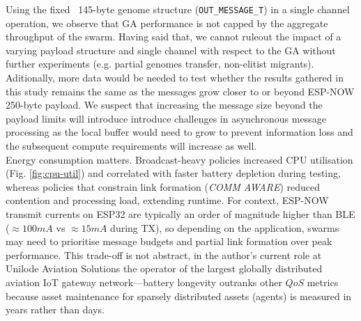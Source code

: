 \documentclass[conference]{IEEEtran}
\begin{document}

Using the fixed ~145-byte genome structure (\texttt{OUT\_MESSAGE\_T}) in a single channel operation, we observe that GA performance is not capped by the aggregate throughput of the swarm. Having said that, we cannot ruleout the impact of a varying payload structure and single channel with respect to the GA without further experiments (e.g. partial genomes transfer, non-elitist migrants). Aditionally, more data would be needed to test whether the results gathered in this study remains the same as the messages grow closer to or beyond ESP-NOW 250-byte payload. We suspect that increasing the message size beyond the payload limits will introduce introduce challenges in asynchronous message processing as the local buffer would need to grow to prevent information loss and the subsequent compute requirements will increase as well.\\



Energy consumption matters. Broadcast-heavy policies increased CPU utilisation (Fig. \ref{fig:cpu-util}) and correlated with faster battery depletion during testing, whereas policies that constrain link formation (\emph{COMM AWARE}) reduced contention and processing load, extending runtime. For context, ESP-NOW transmit currents on ESP32 are typically an order of magnitude higher than BLE ($\approx100mA$ vs $\approx15mA$ during TX), so depending on the application, swarms may need to prioritise message budgets and partial link formation over peak performance. This trade-off is not abstract, in the author's current role at Unilode Aviation Solutions the operator of the largest globally distributed aviation IoT gateway network—battery longevity outranks other $QoS$ metrics because asset maintenance for sparsely distributed assets (agents) is measured in years rather than days.\\
\end{document}

